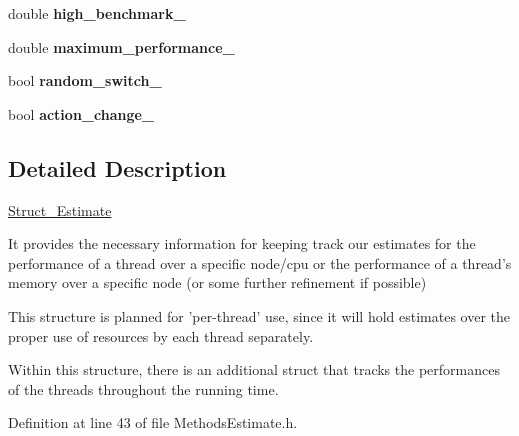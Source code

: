 \begin{DoxyCompactItemize}
\item 
\hypertarget{structStruct__Estimate_aa876453ecd5a4e13ab9bf772ea4daac5}{double {\bfseries high\-\_\-benchmark\-\_\-}}\label{structStruct__Estimate_aa876453ecd5a4e13ab9bf772ea4daac5}

\item 
\hypertarget{structStruct__Estimate_a9fba7f1bb54a7b5a3f1683f2a567e3d7}{double {\bfseries maximum\-\_\-performance\-\_\-}}\label{structStruct__Estimate_a9fba7f1bb54a7b5a3f1683f2a567e3d7}

\item 
\hypertarget{structStruct__Estimate_aa1470fc0ef35f78f59abd0cc51916711}{bool {\bfseries random\-\_\-switch\-\_\-}}\label{structStruct__Estimate_aa1470fc0ef35f78f59abd0cc51916711}

\item 
\hypertarget{structStruct__Estimate_ac267b3a432bde596b9bf3548c7ac65df}{bool {\bfseries action\-\_\-change\-\_\-}}\label{structStruct__Estimate_ac267b3a432bde596b9bf3548c7ac65df}

\end{DoxyCompactItemize}


\subsection{Detailed Description}
\hyperlink{structStruct__Estimate}{Struct\-\_\-\-Estimate}

It provides the necessary information for keeping track our estimates for the performance of a thread over a specific node/cpu or the performance of a thread's memory over a specific node (or some further refinement if possible)

This structure is planned for 'per-\/thread' use, since it will hold estimates over the proper use of resources by each thread separately.

Within this structure, there is an additional struct that tracks the performances of the threads throughout the running time. 

Definition at line 43 of file Methods\-Estimate.\-h.



